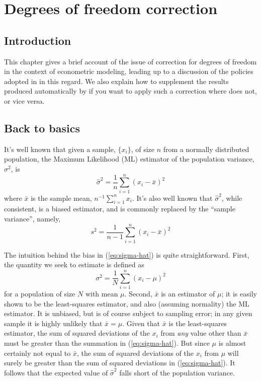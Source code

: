 \chapter{Degrees of freedom correction}
\label{chap:dfcorr}


\section{Introduction}

This chapter gives a brief account of the issue of correction for
degrees of freedom in the context of econometric modeling, leading
up to a discussion of the policies adopted in  in this
regard.  We also explain how to supplement the results produced 
automatically by  if you want to apply such a correction
where  does not, or vice versa.

\section{Back to basics}

It's well known that given a sample, $\{x_i\}$, of size $n$ from a
normally distributed population, the Maximum Likelihood (ML) estimator
of the population variance, $\sigma^2$, is
%
\begin{equation}
\label{eq:sigma-hat}
\hat{\sigma}^2 = \frac{1}{n} \sum_{i=1}^n (x_i - \bar{x})^2
\end{equation}
%
where $\bar{x}$ is the sample mean, $n^{-1} \sum_{i=1}^n x_i$.
It's also well known that $\hat{\sigma}^2$, while consistent,
is a biased estimator, and is commonly replaced by the ``sample
variance'', namely,
%
\begin{equation}
\label{eq:sample-variance}
s^2 = \frac{1}{n-1} \sum_{i=1}^n (x_i - \bar{x})^2
\end{equation}

The intuition behind the bias in (\ref{eq:sigma-hat}) is quite
straightforward.  First, the quantity we seek to estimate is defined
as
%
\[
\sigma^2 = \frac{1}{N} \sum_{i=1}^n (x_i - \mu)^2
\]
%
for a population of size $N$ with mean $\mu$.  Second, $\bar{x}$ is an
estimator of $\mu$; it is easily shown to be the least-squares
estimator, and also (assuming normality) the ML estimator.  It is
unbiased, but is of course subject to sampling error; in any given
sample it is highly unlikely that $\bar{x} = \mu$.  Given that
$\bar{x}$ is the least-squares estimator, the sum of squared
deviations of the $x_i$ from \textit{any} value other than $\bar{x}$
must be greater than the summation in (\ref{eq:sigma-hat}).  But since
$\mu$ is almost certainly not equal to $\bar{x}$, the sum of squared
deviations of the $x_i$ from $\mu$ will surely be greater than the sum
of squared deviations in (\ref{eq:sigma-hat}). It follows that the
expected value of $\hat{\sigma}^2$ falls short of the
population variance.

